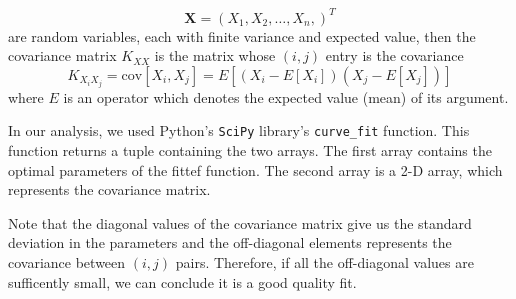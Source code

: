 \begin{equation}
	\mathbf{X} = (X_1, X_2, \ldots, X_n,)^{T}
\end{equation}
are random variables, each with finite variance and expected value, then the covariance matrix $ K_{XX} $ is the matrix whose $ (i, j) $ entry is the covariance
\begin{equation}
	K_{X_i X_j} = \text{cov} [X_i, X_j]	= E [(X_i - E[X_i])(X_j - E[X_j])]
\end{equation}
where $ E $ is an operator which denotes the expected value (mean) of its argument.

In our analysis, we used Python's \texttt{SciPy} library's \texttt{curve\_fit} function. This function returns a tuple containing the two arrays. The first array contains the optimal parameters of the fittef function. The second array is a 2-D array, which represents the covariance matrix. 

Note that the diagonal values of the covariance matrix give us the standard deviation in the parameters and the off-diagonal elements represents the covariance between $ (i, j) $ pairs. Therefore, if all the off-diagonal values are sufficently small, we can conclude it is a good quality fit.



    



